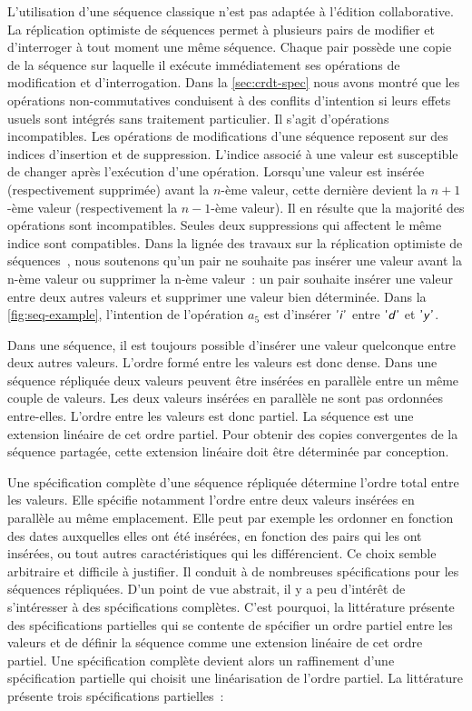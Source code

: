 L'utilisation d'une séquence classique n'est pas adaptée à l'édition collaborative.
La réplication optimiste de séquences permet à plusieurs pairs de modifier et d'interroger à tout moment une même séquence.
Chaque pair possède une copie de la séquence sur laquelle il exécute immédiatement ses opérations de modification et d'interrogation.
Dans la \autoref{sec:crdt-spec} nous avons montré que les opérations non-commutatives conduisent à des conflits d'intention si leurs effets usuels sont intégrés sans traitement particulier.
Il s'agit d'opérations incompatibles.
Les opérations de modifications d'une séquence reposent sur des indices d'insertion et de suppression.
L'indice associé à une valeur est susceptible de changer après l'exécution d'une opération.
Lorsqu'une valeur est insérée (respectivement supprimée) avant la $n$-ème valeur, cette dernière devient la $n+1$-ème valeur (respectivement la $n-1$-ème valeur).
Il en résulte que la majorité des opérations sont incompatibles.
Seules deux suppressions qui affectent le même indice sont compatibles.
Dans la lignée des travaux sur la réplication optimiste de séquences~\autocite{oster_2006_woot,sun_1998_cci}, nous soutenons qu'un pair ne souhaite pas insérer une valeur avant la n-ème valeur ou supprimer la n-ème valeur~:
un pair souhaite insérer une valeur entre deux autres valeurs et supprimer une valeur bien déterminée.
Dans la \autoref{fig:seq-example}, l'intention de l'opération $a_5$ est d'insérer $\textsf{'\textit{i}'}$ entre $\textsf{'\textit{d}'}$ et $\textsf{'\textit{y}'}$.

Dans une séquence, il est toujours possible d'insérer une valeur quelconque entre deux autres valeurs.
L'ordre formé entre les valeurs est donc dense.
Dans une séquence répliquée deux valeurs peuvent être insérées en parallèle entre un même couple de valeurs.
Les deux valeurs insérées en parallèle ne sont pas ordonnées entre-elles.
L'ordre entre les valeurs est donc partiel.
La séquence est une extension linéaire de cet ordre partiel.
Pour obtenir des copies convergentes de la séquence partagée, cette extension linéaire doit être déterminée par conception.

Une spécification complète d'une séquence répliquée détermine l'ordre total entre les valeurs.
Elle spécifie notamment l'ordre entre deux valeurs insérées en parallèle au même emplacement.
Elle peut par exemple les ordonner en fonction des dates auxquelles elles ont été insérées, en fonction des pairs qui les ont insérées, ou tout autres caractéristiques qui les différencient.
Ce choix semble arbitraire et difficile à justifier.
Il conduit à de nombreuses spécifications pour les séquences répliquées.
D'un point de vue abstrait, il y a peu d'intérêt de s'intéresser à des spécifications complètes.
C'est pourquoi, la littérature présente des spécifications partielles qui se contente de spécifier un ordre partiel entre les valeurs et de définir la séquence comme une extension linéaire de cet ordre partiel.
Une spécification complète devient alors un raffinement d'une spécification partielle qui choisit une linéarisation de l'ordre partiel.
La littérature présente trois spécifications partielles~:

